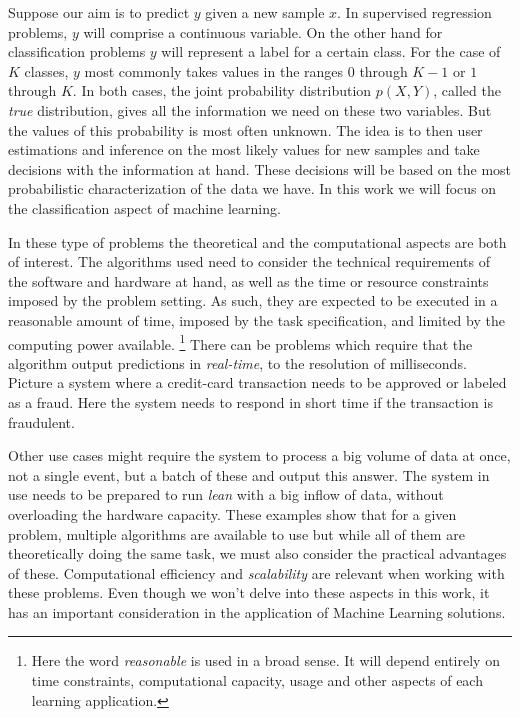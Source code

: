 Suppose our aim is to predict $y$ given a new sample $x$. In supervised regression problems, $y$ will comprise a continuous variable. On the other hand for classification problems $y$ will represent a label for a certain class. For the case of $K$ classes, $y$ most commonly takes values in the ranges $0$ through $K-1$ or $1$ through $K$. In both cases, the joint probability distribution $p(X, Y)$, called the \textit{true} distribution, gives all the information we need on these two variables. But the values of this probability is most often unknown. The idea is to then user estimations and inference on the most likely values for new samples and take decisions with the information at hand. These decisions will be based on the most probabilistic characterization of the data we have. In this work we will focus on the classification aspect of machine learning.

In these type of problems the theoretical and the computational aspects are both of interest. The algorithms used need to consider the technical requirements of the software and hardware at hand, as well as the time or resource constraints imposed by the problem setting. As such, they are expected to be executed in a reasonable amount of time, imposed by the task specification, and limited by the computing power available. \footnote{Here the word \textit{reasonable} is used in a broad sense. It will depend entirely on time constraints, computational capacity, usage and other aspects of each learning application.} There can be problems which require that the algorithm output predictions in \textit{real-time}, to the resolution of milliseconds. Picture a system where a credit-card transaction needs to be approved or labeled as a fraud. Here the system needs to respond in short time if the transaction is fraudulent.

Other use cases might require the system to process a big volume of data at once, not a single event, but a batch of these and output this answer. The system in use needs to be prepared to run \textit{lean} with a big inflow of data, without overloading the hardware capacity. These examples show that for a given problem, multiple algorithms are available to use but while all of them are theoretically doing the same task, we must also consider the practical advantages of these. Computational efficiency and \textit{scalability} are relevant when working with these problems. Even though we won't delve into these aspects in this work, it has an important consideration in the application of Machine Learning solutions.


